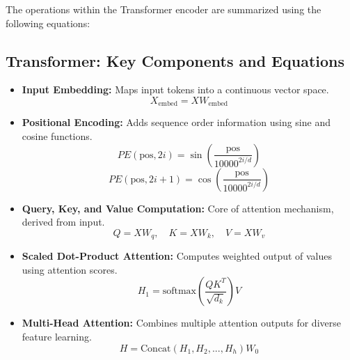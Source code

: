 The operations within the Transformer encoder are summarized using the following equations:
\subsection{Transformer: Key Components and Equations}

\begin{itemize}
	\item \textbf{Input Embedding:} Maps input tokens into a continuous vector space.
	\begin{equation}
		X_{\text{embed}} = X W_{\text{embed}}
	\end{equation}
	
	\item \textbf{Positional Encoding:} Adds sequence order information using sine and cosine functions.
	\begin{equation}
		PE(\text{pos}, 2i) = \sin\left(\frac{\text{pos}}{10000^{2i/d}}\right)
	\end{equation}
	\begin{equation}
		PE(\text{pos}, 2i+1) = \cos\left(\frac{\text{pos}}{10000^{2i/d}}\right)
	\end{equation}
	
	\item \textbf{Query, Key, and Value Computation:} Core of attention mechanism, derived from input.
	\begin{equation}
		Q = XW_q,\quad K = XW_k,\quad V = XW_v
	\end{equation}
	
	\item \textbf{Scaled Dot-Product Attention:} Computes weighted output of values using attention scores.
	\begin{equation}
		H_1 = \text{softmax}\left(\frac{QK^T}{\sqrt{d_k}}\right) V
	\end{equation}
	
	\item \textbf{Multi-Head Attention:} Combines multiple attention outputs for diverse feature learning.
	\begin{equation}
		H = \text{Concat}(H_1, H_2, ..., H_h) W_0
	\end{equation}
\end{itemize}









































